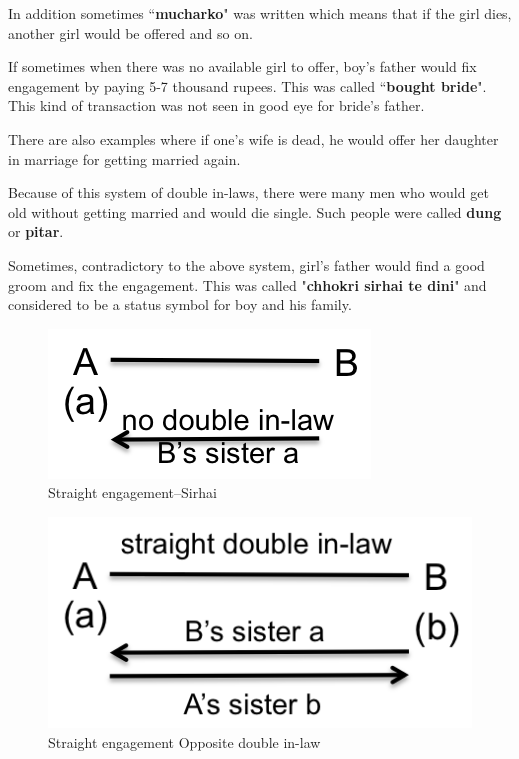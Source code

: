 In addition sometimes ``\textbf{mucharko}" was written which means that if the
girl dies, another girl would be offered and so on.

If sometimes when there was no available girl to offer, boy's father would fix
engagement by paying 5-7 thousand rupees. This was called ``\textbf{bought
bride}". This kind of transaction was not seen in good eye for bride's father.

There are also examples where if one's wife is dead, he would offer her
daughter in marriage for getting married again. 

Because of this system of double in-laws, there were many men who would get old
without getting married and would die single. Such people were called
\textbf{dung} or \textbf{pitar}.

Sometimes, contradictory to the above system, girl's father would find a good
groom and fix the engagement. This was called "\textbf{chhokri sirhai te dini}"
and considered to be a status symbol for boy and his family.

\begin{figure}
\center
\includegraphics{figures/engagement/straight-sirhai}
\caption{Straight engagement--Sirhai
\label{figure:engage_1}}
\end{figure}

\begin{figure}
\center
\includegraphics{figures/engagement/straight_opposite_2}
\caption{ Straight engagement Opposite double in-law
\label{figure:engage_2}}
\end{figure}

